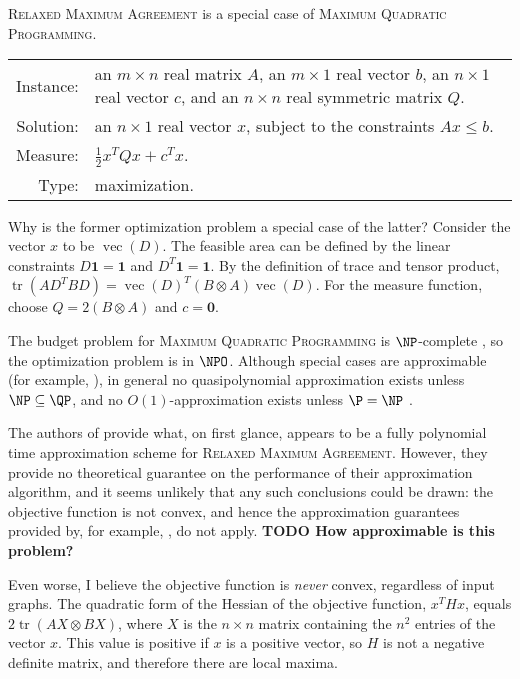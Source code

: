 \documentclass{article}
\newcommand{\todo}[1]{\textbf{TODO #1}}
\newcommand{\1}{\mathbf{1}}
\newcommand{\RMA}{\textsc{Relaxed Maximum Agreement}}
\newcommand{\MQP}{\textsc{Maximum Quadratic Programming}}
\DeclareMathOperator{\tr}{tr}
\DeclareMathOperator{\vect}{vec}
\begin{document}
\RMA{} is a special case of \MQP{}.

\begin{definition}[\MQP{}]
  \mbox{}

  \begin{tabular}{r p{9.3cm}}
    Instance: & an $m \times n$ real matrix $A$, an $m \times 1$ real vector $b$, an $n \times 1$ real vector $c$, and an $n \times n$ real symmetric matrix $Q$. \\
    Solution: & an $n \times 1$ real vector $x$, subject to the constraints $Ax \leq b$. \\
    Measure: & $\frac{1}{2} x^T Q x + c^T x$. \\
    Type: & maximization.
  \end{tabular}
\end{definition}

Why is the former optimization problem a special case of the latter?
Consider the vector $x$ to be $\vect(D)$.
The feasible area can be defined by the linear constraints $D \1 = \1$ and $D^T \1 = \1$.
By the definition of trace and tensor product, $\tr(AD^TBD) = \vect(D)^T (B \otimes A) \vect(D)$.
For the measure function, choose $Q = 2(B \otimes A)$ and $c = \mathbf{0}$.

The budget problem for \MQP{} is $\NP$-complete \autocite{vavasis90}, so the optimization problem is in $\NPO$.
Although special cases are approximable (for example, \autocite{vavasis92, fly98}), in general no quasipolynomial approximation exists unless $\NP \subseteq \QP$, and no $O(1)$-approximation exists unless $\P = \NP$ \autocite{br95}.

The authors of \autocite{v14} provide what, on first glance, appears to be a fully polynomial time approximation scheme for \RMA{}.
However, they provide no theoretical guarantee on the performance of their approximation algorithm, and it seems unlikely that any such conclusions could be drawn: the objective function is not convex, and hence the approximation guarantees provided by, for example, \autocite[Theorem~2.3]{jaggi11}, do not apply.
\todo{How approximable is this problem?}

Even worse, I believe the objective function is \emph{never} convex, regardless of input graphs.
The quadratic form of the Hessian of the objective function, $x^T H x$, equals $2 \tr(AX \otimes BX)$, where $X$ is the $n \times n$ matrix containing the $n^2$ entries of the vector $x$.
This value is positive if $x$ is a positive vector, so $H$ is not a negative definite matrix, and therefore there are local maxima.
\end{document}
